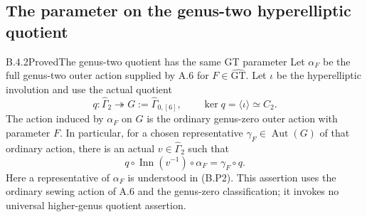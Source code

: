 \subsection{The parameter on the genus-two hyperelliptic quotient}

\begin{result}{B.4.2}{Proved}{The genus-two quotient has the same GT parameter}
Let $\alpha_F$ be the full genus-two outer action supplied by A.6 for
$F\in\widehat{\mathrm{GT}}$. Let $\iota$ be the hyperelliptic involution
and use the actual quotient
\[
 q:\widehat\Gamma_2\twoheadrightarrow
       G:=\widehat\Gamma_{0,[6]},\qquad
 \ker q=\langle\iota\rangle\simeq C_2.                 \tag{B.P1}
\]
The action induced by $\alpha_F$ on $G$ is the ordinary genus-zero
outer action with parameter $F$. In particular, for a chosen
representative $\gamma_F\in\operatorname{Aut}(G)$ of that ordinary
action, there is an actual $v\in\widehat\Gamma_2$ such that
\[
 q\circ\operatorname{Inn}(v^{-1})\circ\alpha_F
                    =\gamma_F\circ q.                 \tag{B.P2}
\]
Here a representative of $\alpha_F$ is understood in (B.P2).
This assertion uses the ordinary sewing action of A.6 and the
genus-zero classification; it invokes no universal higher-genus
quotient assertion.
\end{result}

